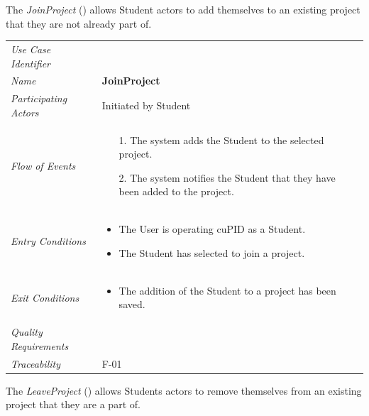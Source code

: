 \documentclass[12pt,letterpaper]{article}
\begin{document}
The {\it JoinProject} () allows Student actors to add themselves to an existing project that they are not already part of.

\begin{center}
	\begin{tabu} to 
		\toprule
		Use Case Identifier &  \\
		Name & {\bf JoinProject} \\
		Participating Actors & Initiated by Student \\
		Flow of Events & 
		\begin{minipage}[t]{\linewidth}
		    \begin{enumerate}
				\item[1.] The system adds the Student to the selected project.
				\item[2.] The system notifies the Student that they have been added to the project.
			\end{enumerate}
		\end{minipage} \\

		Entry Conditions &
		\begin{minipage}[t]{\linewidth}
			\begin{itemize}
			    \item The User is operating cuPID as a Student.
			    \item The Student has selected to join a project.
	        \end{itemize}
		\end{minipage} \\

		Exit Conditions &
		\begin{minipage}[t]{\linewidth}
			\begin{itemize}
			    \item The addition of the Student to a project has been saved.
	        \end{itemize}
		\end{minipage} \\

		Quality Requirements & \\

		Traceability & F-01 \\
		\toprule
	\end{tabu}
\end{center}

\vspace{1em}
The {\it LeaveProject} () allows Students actors to remove themselves from an existing project that they are a part of.
\end{document}
